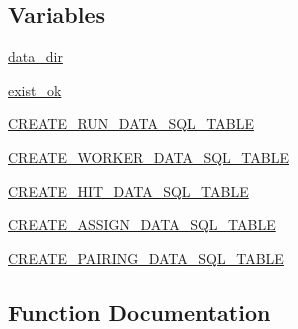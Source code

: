 \subsection*{Variables}
\begin{DoxyCompactItemize}
\item 
\hyperlink{namespaceparlai_1_1mturk_1_1core_1_1dev_1_1mturk__data__handler_ac09f41edba457d8e1fc11da9154958d9}{data\+\_\+dir}
\item 
\hyperlink{namespaceparlai_1_1mturk_1_1core_1_1dev_1_1mturk__data__handler_a5e74bfcab8936656421142da4213addb}{exist\+\_\+ok}
\item 
\hyperlink{namespaceparlai_1_1mturk_1_1core_1_1dev_1_1mturk__data__handler_abfb32f1f9633bb526022884250328877}{C\+R\+E\+A\+T\+E\+\_\+\+R\+U\+N\+\_\+\+D\+A\+T\+A\+\_\+\+S\+Q\+L\+\_\+\+T\+A\+B\+LE}
\item 
\hyperlink{namespaceparlai_1_1mturk_1_1core_1_1dev_1_1mturk__data__handler_a36f8dbc7bf9c58cf7910dd68459ac5aa}{C\+R\+E\+A\+T\+E\+\_\+\+W\+O\+R\+K\+E\+R\+\_\+\+D\+A\+T\+A\+\_\+\+S\+Q\+L\+\_\+\+T\+A\+B\+LE}
\item 
\hyperlink{namespaceparlai_1_1mturk_1_1core_1_1dev_1_1mturk__data__handler_a929482e75bb98b31b99b0baee6eb6d59}{C\+R\+E\+A\+T\+E\+\_\+\+H\+I\+T\+\_\+\+D\+A\+T\+A\+\_\+\+S\+Q\+L\+\_\+\+T\+A\+B\+LE}
\item 
\hyperlink{namespaceparlai_1_1mturk_1_1core_1_1dev_1_1mturk__data__handler_a0f33a1fdb2e1f3307d6541af70cb9290}{C\+R\+E\+A\+T\+E\+\_\+\+A\+S\+S\+I\+G\+N\+\_\+\+D\+A\+T\+A\+\_\+\+S\+Q\+L\+\_\+\+T\+A\+B\+LE}
\item 
\hyperlink{namespaceparlai_1_1mturk_1_1core_1_1dev_1_1mturk__data__handler_a6afbfdaad98f5eaa8055533cac77e802}{C\+R\+E\+A\+T\+E\+\_\+\+P\+A\+I\+R\+I\+N\+G\+\_\+\+D\+A\+T\+A\+\_\+\+S\+Q\+L\+\_\+\+T\+A\+B\+LE}
\end{DoxyCompactItemize}


\subsection{Function Documentation}
\mbox{\label{namespaceparlai_1_1mturk_1_1core_1_1dev_1_1mturk__data__handler_a91afc0627fc6e88d49e71f4471fb56b8}} 
